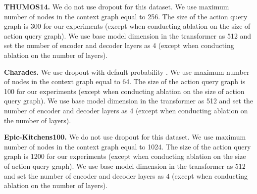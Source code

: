 \documentclass[10pt,twocolumn,letterpaper]{article}
\begin{document}
\noindent \textbf{THUMOS14. } We do not use dropout for this dataset. We use maximum number of nodes in the context graph  equal to 256. The size of the action query graph is 300 for our experiments (except when conducting ablation on the size of action query graph). We use base model dimension in the transformer as 512 and set the number of encoder and decoder layers as 4 (except when conducting ablation on the number of layers).

\textbf{Charades. } We use dropout with default probability . We use maximum number of nodes in the context graph  equal to 64. The size of the action query graph is 100 for our experiments (except when conducting ablation on the size of action query graph). We use base model dimension in the transformer as 512 and set the number of encoder and decoder layers as 4 (except when conducting ablation on the number of layers).

\textbf{Epic-Kitchens100. }We do not use dropout for this dataset. We use maximum number of nodes in the context graph  equal to 1024. The size of the action query graph is 1200 for our experiments (except when conducting ablation on the size of action query graph). We use base model dimension in the transformer as 512 and set the number of encoder and decoder layers as 4 (except when conducting ablation on the number of layers).






 
 
\end{document}
